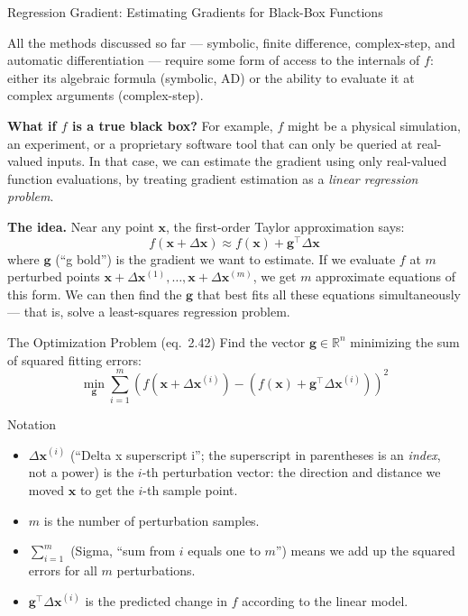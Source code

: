 \documentclass[aspectratio=169,10pt]{beamer}
\newcommand{\x}{\mathbf{x}}
\begin{document}
\begin{frame}[allowframebreaks]{Regression Gradient: Estimating Gradients for Black-Box Functions}

  All the methods discussed so far --- symbolic, finite difference,
  complex-step, and automatic differentiation --- require some form of
  access to the internals of $f$: either its algebraic formula (symbolic,
  AD) or the ability to evaluate it at complex arguments (complex-step).

  \textbf{What if $f$ is a true black box?}
  For example, $f$ might be a physical simulation, an experiment, or a
  proprietary software tool that can only be queried at real-valued inputs.
  In that case, we can estimate the gradient using only real-valued
  function evaluations, by treating gradient estimation as a
  \emph{linear regression problem}.

  \medskip
  \textbf{The idea.}
  Near any point $\x$, the first-order Taylor approximation says:
  \[
    f(\x + \Delta\x) \approx f(\x) + \mathbf{g}^\top \Delta\x
  \]
  where $\mathbf{g}$ (``g bold'') is the gradient we want to estimate.
  If we evaluate $f$ at $m$ perturbed points
  $\x + \Delta\x^{(1)}, \ldots, \x + \Delta\x^{(m)}$,
  we get $m$ approximate equations of this form.
  We can then find the $\mathbf{g}$ that best fits all these equations
  simultaneously --- that is, solve a least-squares regression problem.

  \begin{block}{The Optimization Problem (eq.\ 2.42)}
    Find the vector $\mathbf{g} \in \mathbb{R}^n$ minimizing the sum of
    squared fitting errors:
    \[
      \min_{\mathbf{g}} \sum_{i=1}^{m}
      \left(
        f\!\left(\x + \Delta\x^{(i)}\right)
        - \left(f(\x) + \mathbf{g}^\top \Delta\x^{(i)}\right)
      \right)^{\!2}
    \]
  \end{block}

  \begin{block}{Notation}
    \begin{itemize}
      \item $\Delta\x^{(i)}$ (``Delta x superscript i''; the superscript
            in parentheses is an \emph{index}, not a power) is the $i$-th
            perturbation vector: the direction and distance we moved
            $\x$ to get the $i$-th sample point.
      \item $m$ is the number of perturbation samples.
      \item $\sum_{i=1}^{m}$ (Sigma, ``sum from $i$ equals one to $m$'')
            means we add up the squared errors for all $m$ perturbations.
      \item $\mathbf{g}^\top \Delta\x^{(i)}$ is the predicted change in
            $f$ according to the linear model.
    \end{itemize}
  \end{block}


\end{frame}
\end{document}
